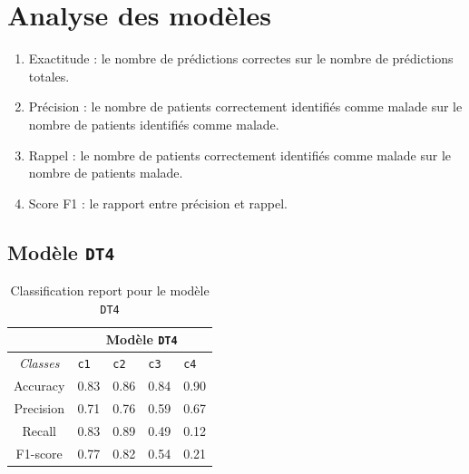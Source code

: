 \chapter{Analyse des modèles}

\begin{enumerate}
    \item Exactitude : le nombre de prédictions correctes sur le nombre de prédictions totales.
    \item Précision : le nombre de patients correctement identifiés comme malade sur le nombre de patients identifiés comme malade.
    \item Rappel : le nombre de patients correctement identifiés comme malade sur le nombre de patients malade.
    \item Score F1 : le rapport entre précision et rappel.
\end{enumerate}

\section{Modèle \texttt{DT4}}

\begin{table}[ht]
  \begin{tabular}{ m{5em} | m{1cm}| m{1cm} | m{1cm}| m{1cm} | } 
  \cline{2-5}
             & \multicolumn{4}{|c|}{Modèle \texttt{DT4}}\\
 \hline
 \multicolumn{1}{|c|}{\textit{Classes}} & \hfil \texttt{c1} & \hfil \texttt{c2} & \hfil \texttt{c3} & \hfil \texttt{c4} \\ 
  \hline
  \multicolumn{1}{|c|}{Accuracy} & \hfil 0.83 & \hfil 0.86 & \hfil 0.84 & \hfil 0.90 \\ 
  \hline
  \multicolumn{1}{|c|}{Precision} & \hfil 0.71 & \hfil 0.76 & \hfil 0.59 & \hfil 0.67 \\ 
  \hline
  \multicolumn{1}{|c|}{Recall} & \hfil 0.83 & \hfil 0.89 & \hfil 0.49 & \hfil 0.12 \\ 
  \hline
  \multicolumn{1}{|c|}{F1-score} & \hfil 0.77 & \hfil 0.82 & \hfil 0.54 & \hfil 0.21 \\ 
  \hline
\end{tabular}
\caption{Classification report pour le modèle \texttt{DT4}}
  \label{Tab:Tcr}
\end{table}

